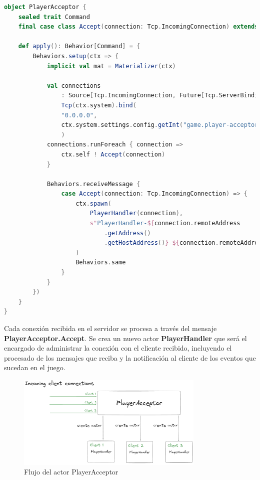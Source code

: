 \begin{lstlisting}[language=Scala, caption={\textbf{Actor PlayerAcceptor}}]
object PlayerAcceptor {
    sealed trait Command
    final case class Accept(connection: Tcp.IncomingConnection) extends Command

    def apply(): Behavior[Command] = {
        Behaviors.setup(ctx => {
            implicit val mat = Materializer(ctx)

            val connections
                : Source[Tcp.IncomingConnection, Future[Tcp.ServerBinding]] =
                Tcp(ctx.system).bind(
                "0.0.0.0",
                ctx.system.settings.config.getInt("game.player-acceptor.port")
                )
            connections.runForeach { connection =>
                ctx.self ! Accept(connection)
            }

            Behaviors.receiveMessage {
                case Accept(connection: Tcp.IncomingConnection) => {
                    ctx.spawn(
                        PlayerHandler(connection),
                        s"PlayerHandler-${connection.remoteAddress
                            .getAddress()
                            .getHostAddress()}-${connection.remoteAddress.getPort()}"
                    )
                    Behaviors.same
                }
            }
        })
    }
}
\end{lstlisting}

Cada conexión recibida en el servidor se procesa a través del mensaje \textbf{PlayerAcceptor.Accept}.
Se crea un nuevo actor \textbf{PlayerHandler} que será el encargado de administrar la conexión con el cliente recibido, incluyendo
el procesado de los mensajes que reciba y la notificación al cliente de los eventos que sucedan en el juego.

\begin{figure}[htbp]
    \centering
    \includegraphics[width=0.8\textwidth]{../assets/player-acceptor.png}
    \caption{Flujo del actor PlayerAcceptor}
\end{figure}

